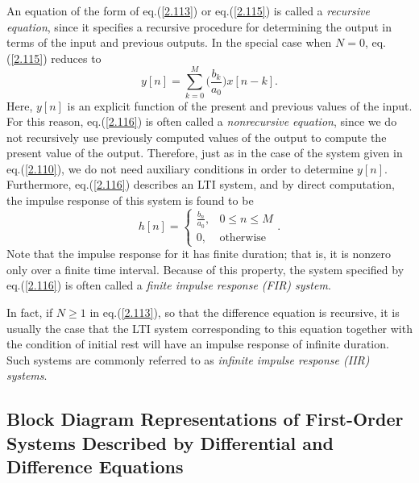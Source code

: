 \documentclass[a4paper,twoside]{book}
\begin{document}
An equation of the form of eq.\;(\ref{2.113}) or eq.\;(\ref{2.115}) is called a \textit{recursive equation}, since it specifies a recursive procedure for determining the output in terms of the input and previous outputs. In the special case when $N=0$, eq.\;(\ref{2.115}) reduces to
\begin{equation}
    y[n] = \sum_{k=0}^M\biggl(\frac{b_k}{a_0}\biggr)x[n-k].
    \label{2.116}
\end{equation}
Here, $y[n]$ is an explicit function of the present and previous values of the input. For this reason, eq.\;(\ref{2.116}) is often called a \textit{nonrecursive equation}, since we do not recursively use previously computed values of the output to compute the present value of the output. Therefore, just as in the case of the system given in eq.\;(\ref{2.110}), we do not need auxiliary conditions in order to determine $y[n]$. Furthermore, eq.\;(\ref{2.116}) describes an LTI system, and by direct computation, the impulse response of this system is found to be
\begin{equation}
    \left.h[n]=\left\{\begin{array}{ll}\frac{b_n}{a_0},&0\leq n\leq M\\0,&\text{otherwise}\end{array}\right.\right..
    \label{2.117}
\end{equation}
Note that the impulse response for it has finite duration; that is, it is nonzero only over a finite time interval. Because of this property, the system specified by eq.\;(\ref{2.116}) is often called a \textit{finite impulse response (FIR) system}.

In fact, if $N\ge 1$ in eq.\;(\ref{2.113}), so that the difference equation is recursive, it is usually the case that the LTI system corresponding to this equation together with the condition of initial rest will have an impulse response of infinite duration. Such systems are commonly referred to as \textit{infinite impulse response (IIR) systems}.

\subsection{Block Diagram Representations of First-Order Systems Described by Differential and Difference Equations}
\end{document}
